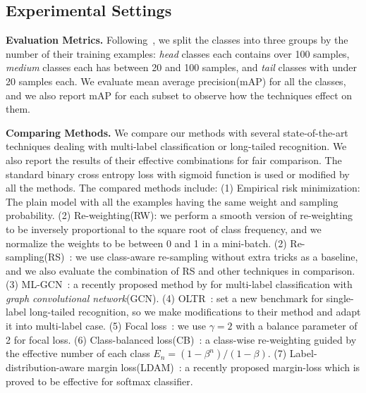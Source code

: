 \documentclass[runningheads]{llncs}
\begin{document}
\subsection{Experimental Settings}

\noindent\textbf{Evaluation Metrics.}
Following~\cite{liu2019largescale}, we split the classes into three groups by the number of their training examples: \textit{head} classes each contains over 100 samples, \textit{medium} classes each has between 20 and 100 samples, and \textit{tail} classes with under 20 samples each. 
We evaluate mean average precision(mAP) for all the classes, and we also report mAP for each subset to observe how the techniques effect on them.

\noindent\textbf{Comparing Methods.}
We compare our methods with several state-of-the-art techniques dealing with multi-label classification or long-tailed recognition. We also report the results of their effective combinations for fair comparison.
The standard binary cross entropy loss with sigmoid function is used or modified by all the methods. 
The compared methods include:
(1) Empirical risk minimization: The plain model with all the examples having the same weight and sampling probability. 
(2) Re-weighting(RW): we perform a smooth version of re-weighting to be inversely proportional to the square root of class frequency, and we normalize the weights to be between 0 and 1 in a mini-batch.
(2) Re-sampling(RS)~\cite{shen2016relay}: we use class-aware re-sampling without extra tricks as a baseline, and we also evaluate the combination of RS and other techniques in comparison.
(3) ML-GCN~\cite{chen2019mlgcn}: a recently proposed method by for multi-label classification with \textit{graph convolutional network}(GCN).
(4) OLTR~\cite{liu2019largescale}: set a new benchmark for single-label long-tailed recognition, so we make modifications to their method and adapt it into multi-label case. 
(5) Focal loss~\cite{lin2017focal}: we use $\gamma=2$ with a balance parameter of 2 for focal loss.
(6) Class-balanced loss(CB)~\cite{cui2019cb}: a class-wise re-weighting guided by the effective number of each class $E_n=(1-\beta^n)/(1-\beta)$. 
(7) Label-distribution-aware margin loss(LDAM)~\cite{cao2019ldam}: a recently proposed margin-loss which is proved to be effective for softmax classifier.
\end{document}
